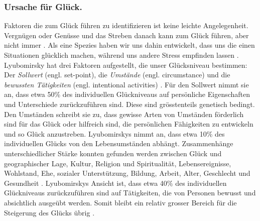 \subsubsection{Ursache für Glück.}
Faktoren die zum Glück führen zu identifizieren ist keine leichte Angelegenheit. Vergnügen oder Genüsse und das Streben danach kann zum Glück führen, aber nicht immer \cite{Diener2009, Eid2008}. Als eine Spezies haben wir uns dahin entwickelt, dass uns die einen Situationen glücklich machen, während uns andere Stress empfinden lassen \cite{Carr2011}. Lyubomirsky hat drei Faktoren aufgestellt, die unser Glücksniveau bestimmen: Der \textit{Sollwert} (engl. set-point), die \textit{Umstände} (engl. circumstance) und die \textit{bewussten Tätigkeiten} (engl. intentional activities) \cite{Lyubomirsky2008, Lyubomirsky2005}. Für den Sollwert nimmt sie an, dass etwa 50\% des individuellen Glückniveaus auf persönliche Eigenschaften und Unterschiede zurückzuführen sind. Diese sind grösstenteils genetisch bedingt. Den Umständen schreibt sie zu, dass gewisse Arten von Umständen förderlich sind für das Glück oder hilfreich sind, die persönlichen Fähigkeiten zu entwickeln und so Glück anzustreben. Lyubomirskys nimmt an, dass etwa 10\% des individuellen Glücks von den Lebensumständen abhängt. Zusammenhänge unterschiedlicher Stärke konnten gefunden werden zwischen Glück und geographischer Lage, Kultur, Religion und Spiritualität, Lebensereignisse, Wohlstand, Ehe, sozialer Unterstützung, Bildung, Arbeit, Alter, Geschlecht und Gesundheit \cite{Carr2011}. Lyubomirskys Ansicht ist, dass etwa 40\% des individuellen Glückniveaus zurückzuführen sind auf Tätigkeiten, die von Personen bewusst und absichtlich ausgeübt werden. Somit bleibt ein relativ grosser Bereich für die Steigerung des Glücks übrig \cite{Lyubomirsky2008}.


